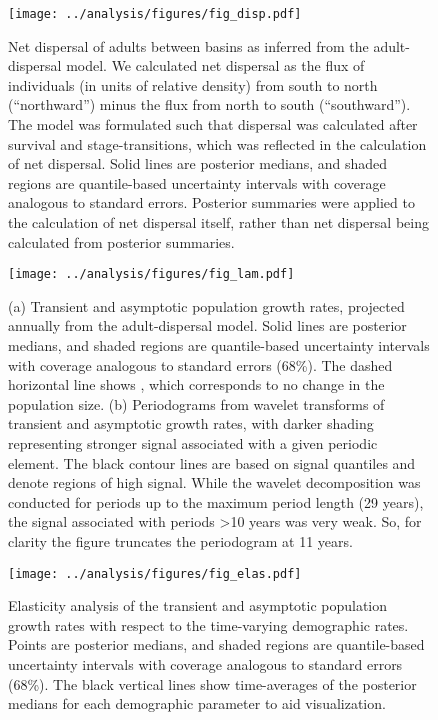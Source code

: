 \documentclass[11pt]{article}
\begin{document}
\clearpage
\begin{figure}
\centering
\texttt{[image: ../analysis/figures/fig\_disp.pdf]}
\caption{\label{fig:disp}
Net dispersal of adults between basins as inferred from the adult-dispersal model.
We calculated net dispersal as the flux of individuals (in units of relative density)
from south to north (``northward'') minus the flux from north to south (``southward'').
The model was formulated such that dispersal was calculated after survival and stage-transitions,
which was reflected in the calculation of net dispersal.
Solid lines are posterior medians,
and shaded regions are quantile-based uncertainty intervals
with coverage analogous to standard errors.
Posterior summaries were applied to the calculation of net dispersal itself,
rather than net dispersal being calculated from posterior summaries.
}
\end{figure}
\clearpage

\clearpage
\begin{figure}
\centering
\texttt{[image: ../analysis/figures/fig\_lam.pdf]}
\caption{\label{fig:lam}
(a) Transient and asymptotic population growth rates,
projected annually from the adult-dispersal model.
Solid lines are posterior medians,
and shaded regions are quantile-based uncertainty intervals
with coverage analogous to standard errors (68\%).
The dashed horizontal line shows ,
which corresponds to no change in the population size.
(b) Periodograms from wavelet transforms of transient and asymptotic growth rates,
with darker shading representing stronger signal associated with a given periodic element.
The black contour lines are based on signal quantiles and denote regions of high signal.
While the wavelet decomposition was conducted for periods up to the maximum period length
(29 years), the signal associated with periods >10 years was very weak.
So, for clarity the figure truncates the periodogram at 11 years.
}
\end{figure}
\clearpage

\clearpage
\begin{figure}
\centering
\texttt{[image: ../analysis/figures/fig\_elas.pdf]}
\caption{\label{fig:elas}
Elasticity analysis of the transient and asymptotic population growth rates
with respect to the time-varying demographic rates.
Points are posterior medians,
and shaded regions are quantile-based uncertainty intervals
with coverage analogous to standard errors (68\%).
The black vertical lines show time-averages of the posterior medians
for each demographic parameter to aid visualization.
}
\end{figure}
\clearpage
\end{document}
